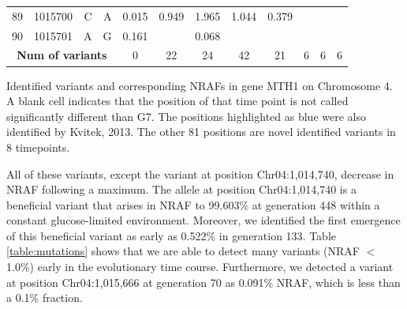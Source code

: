 \documentclass{bmcart}
\begin{document}
\begin{table}[htbp]
\begin{threeparttable}
\begin{tabular}{rrrrrrrrrrrr}
    89    & 1015700 & C     & A     & 0.015 & 0.949 & 1.965 & 1.044 & 0.379 &       &       &  \\
    90    & 1015701 & A     & G     & 0.161 &       & 0.068 &       &       &       &       &  \\
    \midrule
    \multicolumn{4}{c}{\textbf{Num of variants}} & \multicolumn{1}{c}{0} & \multicolumn{1}{c}{22} & \multicolumn{1}{c}{24} & \multicolumn{1}{c}{42} & \multicolumn{1}{c}{21} & \multicolumn{1}{c}{6} & \multicolumn{1}{c}{6} & \multicolumn{1}{c}{6} \\
    \bottomrule
    \end{tabular}
    \begin{tablenotes}
    \item Identified variants and corresponding NRAFs in gene MTH1 on Chromosome 4.
		  A blank cell indicates that the position of that time point is not called significantly different than G7.
		  The positions highlighted as blue were also identified by Kvitek, 2013.
		  The other 81 positions are novel identified variants in 8 timepoints.
    \end{tablenotes}
    \end{threeparttable}
\end{table}%



All of these variants, except the variant at position Chr04:1,014,740, decrease in NRAF following a maximum.
The allele at position Chr04:1,014,740 is a beneficial variant that arises in NRAF to 99.603\% at generation 448 within a constant glucose-limited environment.
Moreover, we identified the first emergence of this beneficial variant as early as 0.522\% in generation 133.
Table \ref{table:mutations} shows that we are able to detect many variants (NRAF $<$ 1.0\%) early in the evolutionary time course.
Furthermore, we detected a variant at position Chr04:1,015,666 at generation 70 as 0.091\% NRAF, which is less than a 0.1\% fraction.
\end{document}
